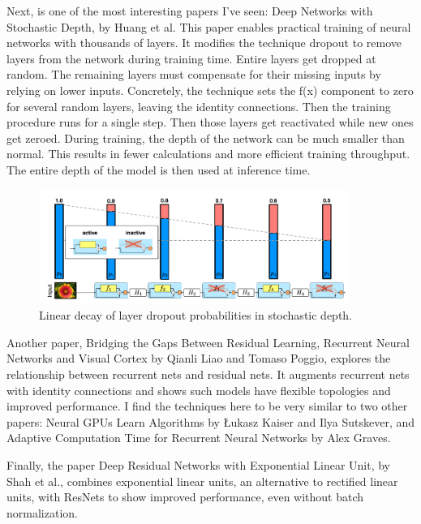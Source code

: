 \documentclass[12pt]{article}
\numberwithin{equation}{section}
\numberwithin{table}{section}
\numberwithin{figure}{section}
\begin{document}
Next, is one of the most interesting papers I’ve seen: Deep Networks with Stochastic Depth, by Huang et al. This paper enables practical training of neural networks with thousands of layers. It modifies the technique dropout to remove layers from the network during training time. Entire layers get dropped at random. The remaining layers must compensate for their missing inputs by relying on lower inputs. Concretely, the technique sets the f(x) component to zero for several random layers, leaving the identity connections. Then the training procedure runs for a single step. Then those layers get reactivated while new ones get zeroed. During training, the depth of the network can be much smaller than normal. This results in fewer calculations and more efficient training throughput. The entire depth of the model is then used at inference time.


\begin{figure} \centering
	\includegraphics[width=0.9\textwidth]{image3.png}
	\caption{Linear decay of layer dropout probabilities in stochastic depth.}
	\label{figure3}
\end{figure}


Another paper, Bridging the Gaps Between Residual Learning, Recurrent Neural Networks and Visual Cortex by Qianli Liao and Tomaso Poggio, explores the relationship between recurrent nets and residual nets. It augments recurrent nets with identity connections and shows such models have flexible topologies and improved performance. I find the techniques here to be very similar to two other papers: Neural GPUs Learn Algorithms by Łukasz Kaiser and Ilya Sutskever, and Adaptive Computation Time for Recurrent Neural Networks by Alex Graves.

Finally, the paper Deep Residual Networks with Exponential Linear Unit, by Shah et al., combines exponential linear units, an alternative to rectified linear units, with ResNets to show improved performance, even without batch normalization.
\end{document}
